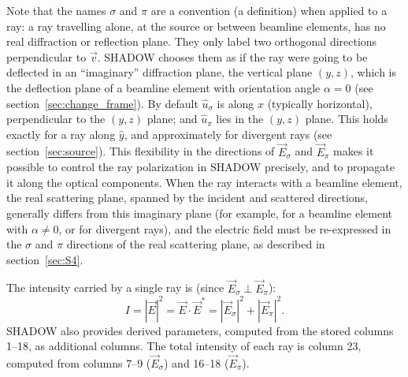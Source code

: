 \documentclass{iucr}
\begin{document}
Note that the names $\sigma$ and $\pi$ are a convention (a definition) when applied to a ray: a ray travelling alone, at the source or between beamline elements, has no real diffraction or reflection plane. They only label two orthogonal directions perpendicular to $\vec{v}$. SHADOW chooses them as if the ray were going to be deflected in an ``imaginary'' diffraction plane, the vertical plane $(y,z)$, which is the deflection plane of a beamline element with orientation angle $\alpha=0$ (see section~\ref{sec:change_frame}). By default $\hat{u}_\sigma$ is along $\hat{x}$ (typically horizontal), perpendicular to the $(y,z)$ plane; and $\hat{u}_\pi$ lies in the $(y,z)$ plane. This holds exactly for a ray along $\hat{y}$, and approximately for divergent rays (see section~\ref{sec:source}). This flexibility in the directions of $\vec{E}_\sigma$ and $\vec{E}_\pi$ makes it possible to control the ray polarization in SHADOW precisely, and to propagate it along the optical components.
When the ray interacts with a beamline element, the real scattering plane, spanned by the incident and scattered directions, generally differs from this imaginary plane (for example, for a beamline element with $\alpha\neq 0$, or for divergent rays), and the electric field must be re-expressed in the $\sigma$ and $\pi$ directions of the real scattering plane, as described in section~\ref{sec:S4}.

The intensity carried by a single ray is (since $\vec{E}_\sigma \perp \vec{E}_\pi$):
\begin{equation}
   I=|\vec{E}|^2 = \vec{E}\cdot\vec{E}^* =
   |\vec{E}_\sigma|^2 + |\vec{E}_\pi|^2.
\end{equation}
SHADOW also provides derived parameters, computed from the stored columns 1--18, as additional columns. The total intensity of each ray is column 23, computed from columns 7--9 ($\vec{E}_\sigma$) and 16--18 ($\vec{E}_\pi$).
\end{document}
